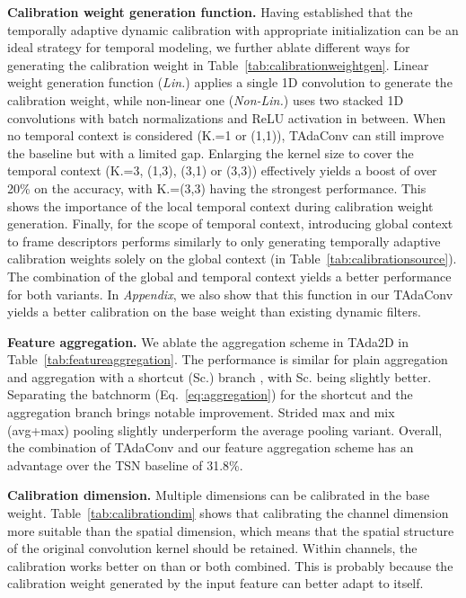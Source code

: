 \documentclass[10pt,journal,compsoc]{IEEEtran}
\begin{document}
\textbf{Calibration weight generation function. } 
Having established that the temporally adaptive dynamic calibration with appropriate initialization can be an ideal strategy for temporal modeling, we further ablate different ways for generating the calibration weight in Table~\ref{tab:calibrationweightgen}. 
Linear weight generation function (\textit{Lin.}) applies a single 1D convolution to generate the calibration weight, while non-linear one (\textit{Non-Lin.}) uses two stacked 1D convolutions with batch normalizations and ReLU activation in between. 
When no temporal context is considered (K.=1 or (1,1)), TAdaConv can still improve the baseline but with a limited gap.
Enlarging the kernel size to cover the temporal context (K.=3, (1,3), (3,1) or (3,3)) effectively yields a boost of over 20\% on the accuracy, with K.=(3,3) having the strongest performance.
This shows the importance of the local temporal context during calibration weight generation.
Finally, for the scope of temporal context, introducing global context to frame descriptors performs similarly to only generating temporally adaptive calibration weights solely on the global context (in Table~\ref{tab:calibrationsource}). 
The combination of the global and temporal context yields a better performance for both variants.
In \textit{Appendix}, we also show 
that this function in our TAdaConv yields a better calibration on the base weight than existing dynamic filters.

\textbf{Feature aggregation. }
We ablate the aggregation scheme in TAda2D in Table~\ref{tab:featureaggregation}.
The performance is similar for plain aggregation  and aggregation with a shortcut (Sc.) branch , with Sc. being slightly better. 
Separating the batchnorm (Eq.~\ref{eq:aggregation}) for the shortcut and the aggregation branch brings notable improvement.
Strided max and mix (avg+max) pooling slightly underperform the average pooling variant. 
Overall, the combination of TAdaConv and our feature aggregation scheme has an advantage over the TSN baseline of 31.8\%. 

\textbf{Calibration dimension. }
Multiple dimensions can be calibrated in the base weight.
Table~\ref{tab:calibrationdim} shows that calibrating the channel dimension more suitable than the spatial dimension, which means that the spatial structure of the original convolution kernel should be retained. 
Within channels, the calibration works better on  than  or both combined.
This is probably because the calibration weight generated by the input feature can better adapt to itself.
\end{document}
